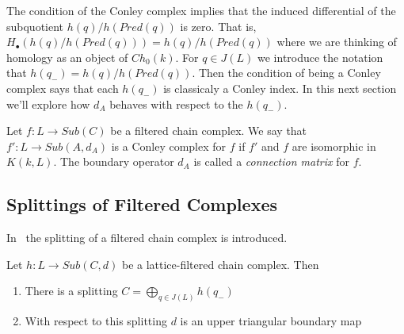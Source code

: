The condition of the Conley complex implies that the induced differential of the subquotient $h(q)/h(Pred(q))$ is zero.  That is, $H_\bullet (h(q)/h(Pred(q))) = h(q)/h(Pred(q))$ where we are thinking of homology as an object of $Ch_0(k)$.  For $q\in J(L)$ we introduce the notation that $h(q_-) = h(q)/h(Pred(q))$.  Then the condition of being a Conley complex says that each $h(q_-)$ is classicaly a Conley index.  In this next section we'll explore how $d_A$ behaves with respect to the $h(q_-)$.


Let $f:L\to Sub(C)$ be a filtered chain complex.  We say that $f':L\to Sub(A,d_A)$ is a Conley complex for $f$ if $f'$ and $f$ are isomorphic in $K(k,L)$.  The boundary operator $d_A$ is called a {\em connection matrix} for $f$. 






\subsection{Splittings of Filtered Complexes}

In~\cite[Section 7]{salamon} the splitting of a filtered chain complex is introduced.  

\begin{prop}
 Let $h:L\to Sub(C,d)$ be a lattice-filtered chain complex.  Then
\begin{enumerate}
\item  There is a splitting $C=\bigoplus_{q\in J(L)} h(q_-)$ 
\item  With respect to this splitting $d$ is an upper triangular boundary map
\end{enumerate}
 \end{prop}


